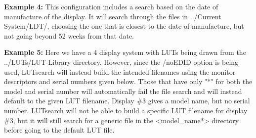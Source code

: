 

\textbf{Example 4:} This configuration includes a search based on the date of manufacture of the display. It will search through the files in \textnormal{../Current System/LDT/}, choosing the one that is closest to the date of manufacture, but not going beyond 52 weeks from that date. 


\textbf{Example 5:} Here we have a 4 display system with LUTs being drawn from the \textnormal{../LUTs/LUT-Library} directory. However, since the /noEDID option is being used, LUTsearch will instead build the intended filenames using the monitor descriptors and serial numbers given below. Those that have only "*" for both the model and serial number will automatically fail the file search and will instead default to the given LUT filename. Display \#3 gives a model name, but no serial number. LUTsearch will not be able to build a specific LUT filename for display \#3, but it will still search for a generic file in the <model\_name*> directory before going to the default LUT file. 

